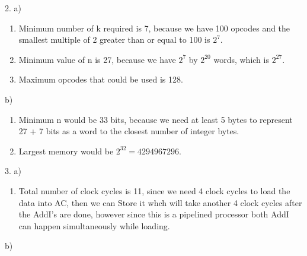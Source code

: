 \documentclass{article}
\begin{document}
2.
a)
\begin{enumerate}
	\item Minimum number of k required is 7, because we have 100 opcodes and the smallest multiple of 2 greater than or equal to 100 is $2^7$.
	\item Minimum value of n is 27, because we have $2^7$ by $2^{20}$ words, which is $2^{27}$.
	\item Maximum opcodes that could be used is 128.

\end{enumerate}
b)
\begin{enumerate}
	\item  Minimum n would be 33 bits, because we need at least 5 bytes to represent 27 + 7 bits as a word to the closest number of integer bytes.
	\item Largest memory would be $2^{32} =4294967296$.
\end{enumerate}
3.
a)
\begin{enumerate}
	\item Total number of clock cycles is 11, since we need 4 clock cycles to load the data into AC, then we can Store it whch will take another 4 clock cycles after the AddI's are done, however since this is a pipelined processor both AddI can happen simultaneously while loading.
\end{enumerate}
b)
\end{document}

